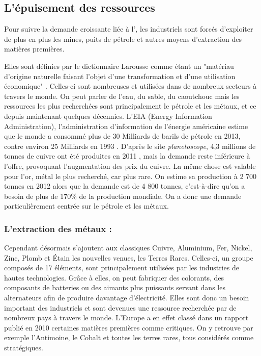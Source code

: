 \subsection{L’épuisement des ressources}

Pour suivre la demande croissante liée à l'\op, les industriels sont forcés d'exploiter de plus en plus les mines, puits de pétrole et autres moyens d'extraction des matières premières.

\bigbreak Elles sont définies par le dictionnaire Larousse comme étant un "matériau d'origine naturelle faisant l'objet d'une transformation et d'une utilisation économique" \cite{LarousseMatiere1eres}. Celles-ci sont nombreuses et utilisées dans de nombreux secteurs à travers le monde. On peut parler de l'eau, du sable, du caoutchouc mais les ressources les plus recherchées sont principalement le pétrole et les métaux, et ce depuis maintenant quelques décennies. L'EIA (Energy Information Administration), l'admi\-nistration d'information de l'énergie américaine estime que le monde a consommé plus de 30 Milliards de barils de pétrole en 2013, contre environ 25 Milliards en 1993 \cite{EAI}. D'après le site \textit{planetoscope}, 4,3 millions de tonnes de cuivre ont été produites en 2011 \cite{planetoscopeOrCuivre}, mais la demande reste inférieure à l'offre, provoquant l'augmentation des prix du cuivre. La même chose est valable pour l'or, métal le plus recherché, car plus rare. On estime sa production à 2 700 tonnes en 2012 alors que la demande est de 4 800 tonnes, c'est-à-dire qu'on a besoin de plus de 170\% de la production mondiale. On a donc une demande particulièrement centrée sur le pétrole et les métaux.


\subsubsection{L'extraction des métaux : }

Cependant désormais s'ajoutent aux classiques Cuivre, Aluminium, Fer, Nickel, Zinc, Plomb et Étain les nouvelles venues, les Terres Rares. Celles-ci, un groupe composés de 17 éléments, sont principalement utilisées par les industries de hautes technologies. Grâce à elles, on peut fabriquer des colorants, des composants de batteries ou des aimants plus puissants servant dans les alternateurs afin de produire davantage d’électricité. Elles sont donc un besoin important des industriels et sont devenues une ressource recherchée par de nombreux pays à travers le monde. L'Europe a en effet classé dans un rapport publié en 2010 \cite{RapportEuropeenTerresRares} certaines matières premières comme critiques. On y retrouve par exemple l'Antimoine, le Cobalt et toutes les terres rares, tous considérés comme stratégiques.

